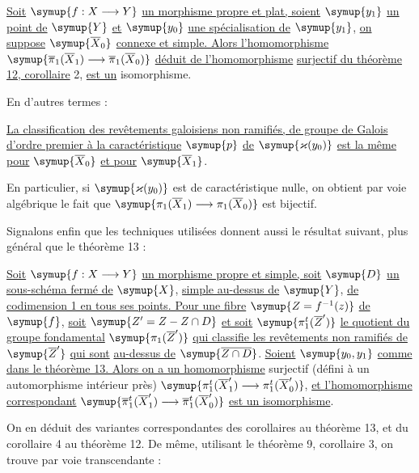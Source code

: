  \uline{Soit} $\symup{f:X\longrightarrow Y}$ \uline{un morphisme propre et plat,
soient} $\symup{y_1}$ \uline{un point de} $\symup{Y}$ \uline{et} $\symup{y_0}$ \uline{une spécialisation de} $\symup{y_1}$, \uline{on suppose}
$\symup{\overline X_0}$ \uline{connexe et simple. Alors l'homomorphisme}
$\symup{\overline\pi_1(\overline X_1)\longrightarrow
\overline\pi_1(\overline X_0)}$ \uline{déduit de l'homomorphisme} 
\uline{surjectif du
théorème 12, corollaire} 2, \uline{est un} isomorphisme.

En d'autres termes :

 \uline{La classification des revêtements galoisiens non
ramifiés, de groupe de Galois d'ordre premier à la caractéristique} $\symup{p}$ \uline{de}
$\symup{\varkappa(y_0)}$ \uline{est la même pour} $\symup{\overline X_0}$ \uline{et pour} $\symup{\overline X_1}$.

En particulier, si $\symup{\varkappa(y_0)}$ est de caractéristique nulle, on obtient par
voie algébrique le fait que
$\symup{\pi_1(\overline X_1)\longrightarrow\pi_1(\overline X_0)}$ est bijectif.

Signalons enfin que les techniques utilisées donnent aussi le résultat
suivant, plus général que le théorème 13 :

 \uline{Soit} $\symup{f:X\longrightarrow Y}$ \uline{un morphisme propre et
simple, soit} $\symup{D}$ \uline{un sous-schéma fermé de} $\symup{X}$, \uline{simple au-dessus de} $\symup{Y}$, \uline{de
codimension 1 en tous ses points. Pour une fibre} $\symup{Z=f^{-1}(z)}$ \uline{de} $\symup{f}$, \uline{soit}
$\symup{Z'=Z-Z\cap D}$ \uline{et soit} $\symup{\pi_1^t(\overline Z')}$ \uline{le quotient du groupe fondamental}
$\symup{\pi_1(\overline Z')}$ \uline{qui classifie les revêtements non ramifiés de} $\symup{\overline Z'}$ \uline{qui sont}
\uline{} \uline{au-dessus de} $\symup{\overline{Z\cap D}}$. \uline{Soient} $\symup{y_0,y_1}$ \uline{comme
dans le théorème 13. Alors on a un homomorphisme} surjectif (défini à un
automorphisme intérieur près)
$\symup{\pi_1^t(\overline X'_1)\longrightarrow\pi_1^t(\overline X'_0)}$,
\uline{et l'homomorphisme correspondant}
$\symup{\overline\pi_1^t(\overline X'_1)
  \longrightarrow\overline\pi_1^t(\overline X'_0)}$
\uline{est un isomorphisme}.

On en déduit des variantes correspondantes des corollaires au théorème 13, et
du corollaire 4 au théorème 12. De même, utilisant le théorème 9, corollaire 3,
on trouve par voie transcendante :

